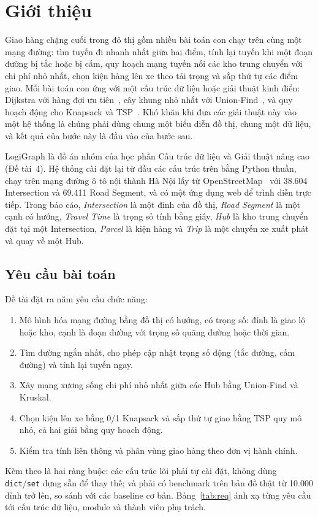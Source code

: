 \section{Giới thiệu}\label{sec:intro}

Giao hàng chặng cuối trong đô thị gồm nhiều bài toán con chạy trên cùng một mạng đường: tìm tuyến đi nhanh nhất giữa hai điểm, tính lại tuyến khi một đoạn đường bị tắc hoặc bị cấm, quy hoạch mạng tuyến nối các kho trung chuyển với chi phí nhỏ nhất, chọn kiện hàng lên xe theo tải trọng và sắp thứ tự các điểm giao. Mỗi bài toán con ứng với một cấu trúc dữ liệu hoặc giải thuật kinh điển: Dijkstra với hàng đợi ưu tiên~\cite{dijkstra1959,goodrich2013}, cây khung nhỏ nhất với Union-Find~\cite{kruskal1956,tarjan1975}, và quy hoạch động cho Knapsack và TSP~\cite{bellman1958,heldkarp1962}. Khó khăn khi đưa các giải thuật này vào một hệ thống là chúng phải dùng chung một biểu diễn đồ thị, chung một dữ liệu, và kết quả của bước này là đầu vào của bước sau.

LogiGraph là đồ án nhóm của học phần Cấu trúc dữ liệu và Giải thuật nâng cao (Đề tài~4). Hệ thống cài đặt lại từ đầu các cấu trúc trên bằng Python thuần, chạy trên mạng đường ô tô nội thành Hà Nội lấy từ OpenStreetMap~\cite{osm} với 38.604 Intersection và 69.411 Road Segment, và có một ứng dụng web để trình diễn trực tiếp. Trong báo cáo, \emph{Intersection} là một đỉnh của đồ thị, \emph{Road Segment} là một cạnh có hướng, \emph{Travel Time} là trọng số tính bằng giây, \emph{Hub} là kho trung chuyển đặt tại một Intersection, \emph{Parcel} là kiện hàng và \emph{Trip} là một chuyến xe xuất phát và quay về một Hub.

\subsection{Yêu cầu bài toán}

Đề tài đặt ra năm yêu cầu chức năng:
\begin{enumerate}
\item[(R1)] Mô hình hóa mạng đường bằng đồ thị có hướng, có trọng số: đỉnh là giao lộ hoặc kho, cạnh là đoạn đường với trọng số quãng đường hoặc thời gian.
\item[(R2)] Tìm đường ngắn nhất, cho phép cập nhật trọng số động (tắc đường, cấm đường) và tính lại tuyến ngay.
\item[(R3)] Xây mạng xương sống chi phí nhỏ nhất giữa các Hub bằng Union-Find và Kruskal.
\item[(R4)] Chọn kiện lên xe bằng 0/1 Knapsack và sắp thứ tự giao bằng TSP quy mô nhỏ, cả hai giải bằng quy hoạch động.
\item[(R5)] Kiểm tra tính liên thông và phân vùng giao hàng theo đơn vị hành chính.
\end{enumerate}
Kèm theo là hai ràng buộc: các cấu trúc lõi phải tự cài đặt, không dùng \texttt{dict}/\texttt{set} dựng sẵn để thay thế; và phải có benchmark trên bản đồ thật từ 10.000 đỉnh trở lên, so sánh với các baseline cơ bản. Bảng~\ref{tab:req} ánh xạ từng yêu cầu tới cấu trúc dữ liệu, module và thành viên phụ trách.

